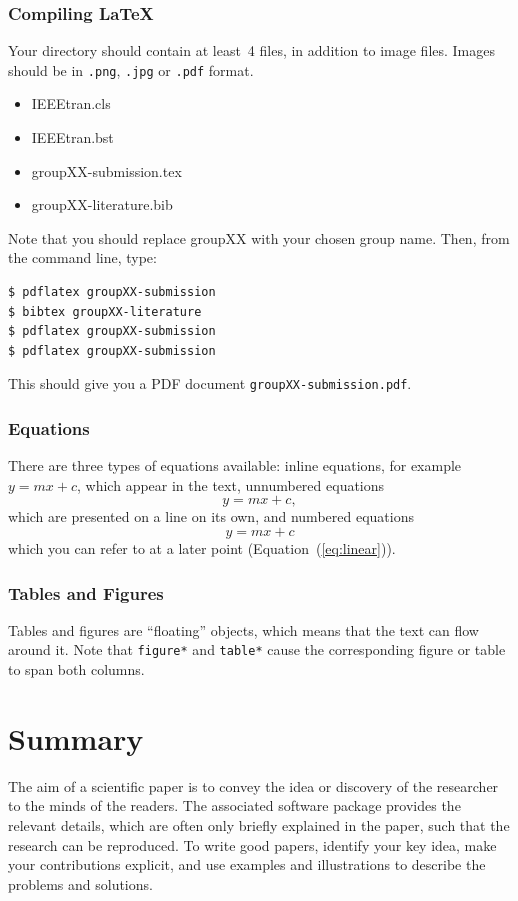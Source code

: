 \documentclass[10pt,conference,compsocconf]{IEEEtran}
\begin{document}
\subsubsection{Compiling \LaTeX{}}
Your directory should contain at least~4 files, in addition to image
files. Images should be in \texttt{.png}, \texttt{.jpg} or
\texttt{.pdf} format.
\begin{itemize}
\item IEEEtran.cls
\item IEEEtran.bst
\item groupXX-submission.tex
\item groupXX-literature.bib
\end{itemize}
Note that you should replace groupXX with your chosen group name.
Then, from the command line, type:
\begin{verbatim}
$ pdflatex groupXX-submission
$ bibtex groupXX-literature
$ pdflatex groupXX-submission
$ pdflatex groupXX-submission
\end{verbatim}
This should give you a PDF document \texttt{groupXX-submission.pdf}.

\subsubsection{Equations}

There are three types of equations available: inline equations, for
example $y=mx + c$, which appear in the text, unnumbered equations
$$y=mx + c,$$
which are presented on a line on its own, and numbered equations
\begin{equation}
  \label{eq:linear}
  y = mx + c
\end{equation}
which you can refer to at a later point (Equation~(\ref{eq:linear})).

\subsubsection{Tables and Figures}

Tables and figures are ``floating'' objects, which means that the text
can flow around it.
Note
that \texttt{figure*} and \texttt{table*} cause the corresponding
figure or table to span both columns.



\section{Summary}

The aim of a scientific paper is to convey the idea or discovery of
the researcher to the minds of the readers. The associated software
package provides the relevant details, which are often only briefly
explained in the paper, such that the research can be reproduced.
To write good papers, identify your key idea, make your contributions
explicit, and use examples and illustrations to describe the problems
and solutions.
\end{document}
